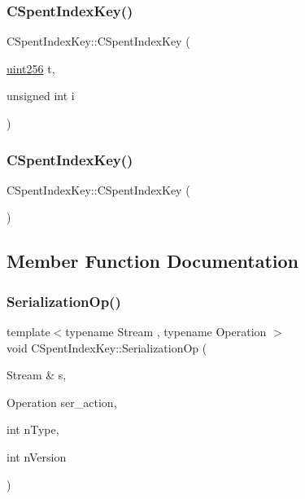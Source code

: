 \subsubsection{\texorpdfstring{C\+Spent\+Index\+Key()}{CSpentIndexKey()}\hspace{0.1cm}{\footnotesize\ttfamily [1/2]}}
{\footnotesize\ttfamily C\+Spent\+Index\+Key\+::\+C\+Spent\+Index\+Key (\begin{DoxyParamCaption}\item[{\mbox{\hyperlink{classuint256}{uint256}}}]{t,  }\item[{unsigned int}]{i }\end{DoxyParamCaption})\hspace{0.3cm}{\ttfamily [inline]}}

\mbox{\label{struct_c_spent_index_key_a06486e70f11c6184e27247cc17fc37c1}} 
\subsubsection{\texorpdfstring{C\+Spent\+Index\+Key()}{CSpentIndexKey()}\hspace{0.1cm}{\footnotesize\ttfamily [2/2]}}
{\footnotesize\ttfamily C\+Spent\+Index\+Key\+::\+C\+Spent\+Index\+Key (\begin{DoxyParamCaption}{ }\end{DoxyParamCaption})\hspace{0.3cm}{\ttfamily [inline]}}



\subsection{Member Function Documentation}
\mbox{\label{struct_c_spent_index_key_a1bd965f78b96ed61cf3c51ef36380d82}} 
\subsubsection{\texorpdfstring{Serialization\+Op()}{SerializationOp()}}
{\footnotesize\ttfamily template$<$typename Stream , typename Operation $>$ \\
void C\+Spent\+Index\+Key\+::\+Serialization\+Op (\begin{DoxyParamCaption}\item[{Stream \&}]{s,  }\item[{Operation}]{ser\+\_\+action,  }\item[{int}]{n\+Type,  }\item[{int}]{n\+Version }\end{DoxyParamCaption})\hspace{0.3cm}{\ttfamily [inline]}}

